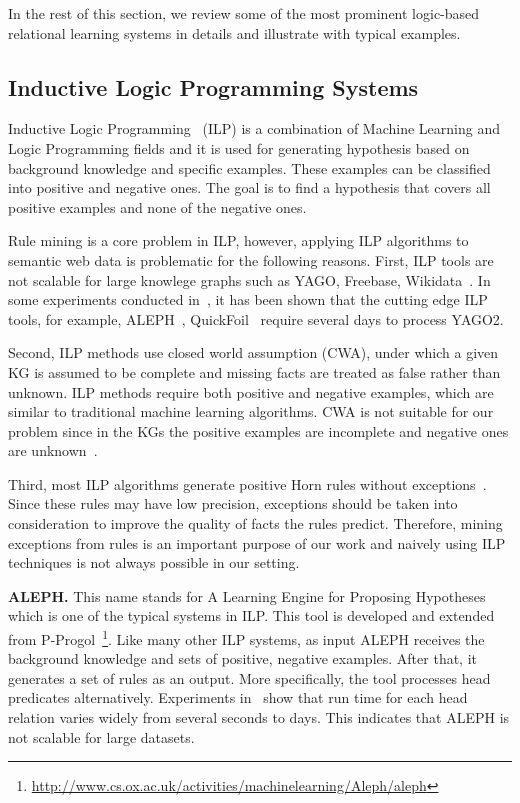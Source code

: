 In the rest of this section, we review some of the most prominent logic-based relational learning systems in details and illustrate with typical examples.

\subsection{Inductive Logic Programming Systems}

Inductive Logic Programming~\cite{ref9} (ILP) is a combination of Machine Learning and Logic Programming fields and it is used for generating hypothesis based on background knowledge and specific examples. These examples can be classified into positive and negative ones. The goal is to find a hypothesis that covers all positive examples and none of the negative ones.

Rule mining is a core problem in ILP, however, applying ILP algorithms to semantic web data is problematic for the following reasons. First, ILP tools are not scalable for large knowlege graphs such as YAGO, Freebase, Wikidata~\cite{ref10}. In some experiments conducted in~\cite{ref10}, it has been shown that the cutting edge ILP tools, for example, ALEPH~\cite{ref14, ref10}, QuickFoil~\cite{ref15, ref10} require several days to process YAGO2.

Second, ILP methods use closed world assumption (CWA), under which a given KG is assumed to be complete and missing facts are treated as false rather than unknown. ILP methods require both positive and negative examples, which are similar to traditional machine learning algorithms. CWA is not suitable for our problem since in the KGs the positive examples are incomplete and negative ones are unknown~\cite{ref10}.

Third, most ILP algorithms generate positive Horn rules without exceptions~\cite{ref11}. Since these rules may have low precision, exceptions should be taken into consideration to improve the quality of facts the rules predict. Therefore, mining exceptions from rules is an important purpose of our work and naively using ILP techniques is not always possible in our setting.

\textbf{ALEPH.} This name stands for A Learning Engine for Proposing Hypotheses which is one of the typical systems in ILP. This tool is developed and extended from P-Progol~\footnote{\url{http://www.cs.ox.ac.uk/activities/machinelearning/Aleph/aleph}}. Like many other ILP systems, as input ALEPH receives the background knowledge and sets of positive, negative examples. After that, it generates a set of rules as an output. More specifically, the tool processes head predicates alternatively. Experiments in~\cite{ref10} show that run time for each head relation varies widely from several seconds to days. This indicates that ALEPH is not scalable for large datasets.

